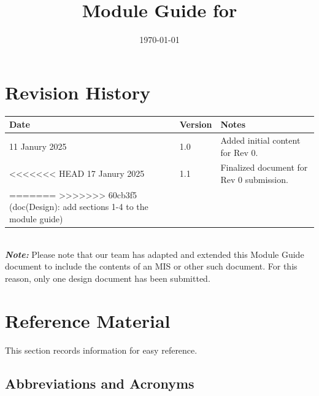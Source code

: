 \documentclass[12pt, titlepage]{article}
\begin{document}
\title{Module Guide for \progname{}} 
\author{\authname}
\date{\today}

\maketitle


\section{Revision History}

\begin{tabularx}{\textwidth}{p{3cm}p{2cm}X}
\toprule {\bf Date} & {\bf Version} & {\bf Notes}\\
\midrule
11 Janury 2025 & 1.0 & Added initial content for Rev 0.\\
<<<<<<< HEAD
17 Janury 2025 & 1.1 & Finalized document for Rev 0 submission.\\
=======
>>>>>>> 60cb3f5 (doc(Design): add sections 1-4 to the module guide)
\bottomrule
\end{tabularx}
\\
\newline \newline
\emph{\textbf{Note:}} Please note that our team has adapted and extended this
Module Guide document to include the contents of an MIS or other such document.
For this reason, only one design document has been submitted.
\newpage

\section{Reference Material}

This section records information for easy reference.

\subsection{Abbreviations and Acronyms}
\end{document}
